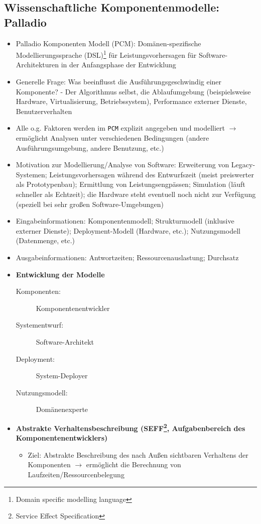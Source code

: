 \subsection{Wissenschaftliche Komponentenmodelle: Palladio}
\begin{itemize}
	\item Palladio Komponenten Modell (PCM): Domänen-spezifische Modellierungssprache (DSL)\footnote{Domain specific modelling language} für Leistungsvorhersagen für Software-Architekturen in der Anfangsphase der Entwicklung
	\item Generelle Frage: Was beeinflusst die Ausführungsgeschwindig einer Komponente? - Der Algorithmus selbst, die Ablaufumgebung (beispielsweise Hardware, Virtualisierung, Betriebssystem), Performance externer Dienste, Benutzerverhalten
	\item Alle o.g. Faktoren werden im \texttt{PCM} explizit angegeben und modelliert \(\rightarrow\) ermöglicht Analysen unter verschiedenen Bedingungen (andere Ausführungsumgebung, andere Benutzung, etc.)
	\item Motivation zur Modellierung/Analyse von Software: Erweiterung von Legacy-Systemen; Leistungsvorhersagen während des Entwurfszeit (meist preiswerter als Prototypenbau); Ermittlung von Leistungsengpässen; Simulation (läuft schneller als Echtzeit); die Hardware steht eventuell noch nicht zur Verfügung (speziell bei sehr großen Software-Umgebungen)
	\item Eingabeinformationen: Komponentenmodell; Strukturmodell (inklusive externer Dienste); Deployment-Modell (Hardware, etc.); Nutzungsmodell (Datenmenge, etc.)
	\item Ausgabeinformationen: Antwortzeiten; Ressourcenauslastung; Durchsatz
	\item \textbf{Entwicklung der Modelle}
	\begin{description}
		\item[Komponenten:] Komponentenentwickler
		\item[Systementwurf:] Software-Architekt
		\item[Deployment:] System-Deployer
		\item[Nutzungsmodell:] Domänenexperte
	\end{description}
	\item \textbf{Abstrakte Verhaltensbeschreibung (SEFF\footnote{Service Effect Specification}, Aufgabenbereich des Komponentenentwicklers)}
	\begin{itemize}
		\item Ziel: Abstrakte Beschreibung des nach Außen sichtbaren Verhaltens der Komponenten \(\rightarrow\) ermöglicht die Berechnung von Laufzeiten/Ressourcenbelegung

\end{itemize}
\end{itemize}
